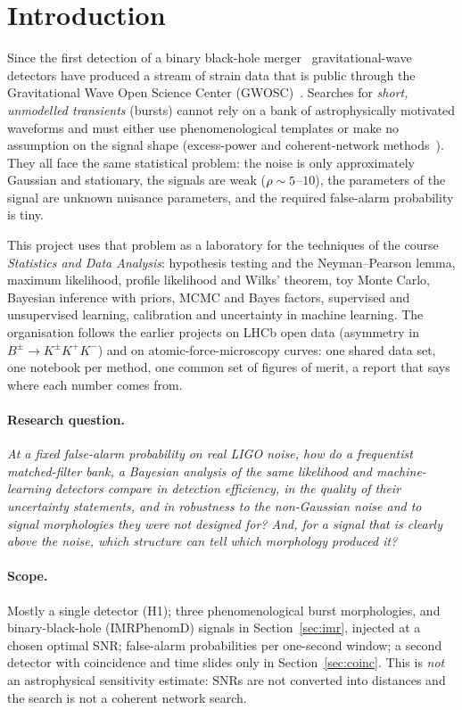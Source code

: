 \section{Introduction}

Since the first detection of a binary black-hole merger~\cite{GW150914} gravitational-wave detectors have produced a stream of strain data that is public through the Gravitational Wave Open Science Center
(GWOSC)~\cite{GWOSCO12}. Searches for \emph{short, unmodelled transients} (bursts) cannot rely on a bank of astrophysically motivated waveforms and must either use phenomenological
templates or make no assumption on the signal shape (excess-power and coherent-network methods~\cite{ExcessPower,cWB}). They all face the same statistical problem: the noise is only approximately
Gaussian and stationary, the signals are weak ($\rho\sim5$--$10$), the parameters of the signal are unknown nuisance parameters, and the required false-alarm probability is tiny.

This project uses that problem as a laboratory for the techniques of the course \emph{Statistics and Data Analysis}: hypothesis testing and the Neyman--Pearson lemma, maximum likelihood,
profile likelihood and Wilks' theorem, toy Monte Carlo, Bayesian inference with priors, MCMC and Bayes factors, supervised and unsupervised learning, calibration and uncertainty in machine learning. The organisation follows the
earlier projects on LHCb open data (asymmetry in $B^\pm\to K^\pm K^+K^-$) and on atomic-force-microscopy curves: one shared data set, one notebook per method, one common set of figures of merit, a report that says where each number comes from.

\paragraph{Research question.} \emph{At a fixed false-alarm probability on real LIGO noise, how do a frequentist matched-filter bank, a Bayesian analysis of the same likelihood and machine-learning detectors
compare in detection efficiency, in the quality of their uncertainty statements, and in robustness to the non-Gaussian noise and to signal morphologies they were not designed for? And, for a signal that is clearly above the noise, which structure can tell which morphology produced it?}

\paragraph{Scope.} Mostly a single detector (H1); three phenomenological burst morphologies, and binary-black-hole (IMRPhenomD) signals in Section~\ref{sec:imr}, injected at a chosen optimal SNR; false-alarm probabilities per one-second window; a second detector with coincidence and time slides only in Section~\ref{sec:coinc}. This is \emph{not} an astrophysical sensitivity estimate: SNRs are not converted into distances and the search is not a coherent network search.

